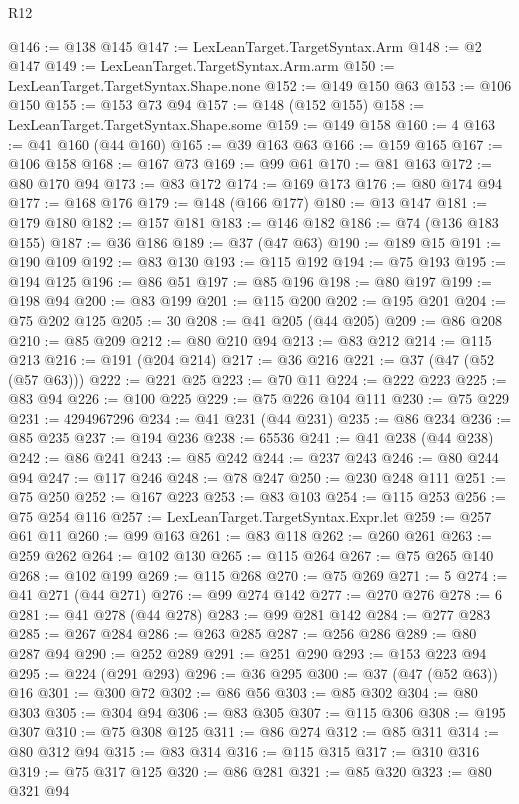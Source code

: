 \begin{lexlean}{R12}
\begin{coremodule}
@146 := @138 @145
@147 := LexLeanTarget.TargetSyntax.Arm
@148 := @2 @147
@149 := LexLeanTarget.TargetSyntax.Arm.arm
@150 := LexLeanTarget.TargetSyntax.Shape.none
@152 := @149 @150 @63
@153 := @106 @150
@155 := @153 @73 @94
@157 := @148 (@152 @155)
@158 := LexLeanTarget.TargetSyntax.Shape.some
@159 := @149 @158
@160 := 4
@163 := @41 @160 (@44 @160)
@165 := @39 @163 @63
@166 := @159 @165
@167 := @106 @158
@168 := @167 @73
@169 := @99 @61
@170 := @81 @163
@172 := @80 @170 @94
@173 := @83 @172
@174 := @169 @173
@176 := @80 @174 @94
@177 := @168 @176
@179 := @148 (@166 @177)
@180 := @13 @147
@181 := @179 @180
@182 := @157 @181
@183 := @146 @182
@186 := @74 (@136 @183 @155)
@187 := @36 @186
@189 := @37 (@47 @63)
@190 := @189 @15
@191 := @190 @109
@192 := @83 @130
@193 := @115 @192
@194 := @75 @193
@195 := @194 @125
@196 := @86 @51
@197 := @85 @196
@198 := @80 @197
@199 := @198 @94
@200 := @83 @199
@201 := @115 @200
@202 := @195 @201
@204 := @75 @202 @125
@205 := 30
@208 := @41 @205 (@44 @205)
@209 := @86 @208
@210 := @85 @209
@212 := @80 @210 @94
@213 := @83 @212
@214 := @115 @213
@216 := @191 (@204 @214)
@217 := @36 @216
@221 := @37 (@47 (@52 (@57 @63)))
@222 := @221 @25
@223 := @70 @11
@224 := @222 @223
@225 := @83 @94
@226 := @100 @225
@229 := @75 @226 @104 @111
@230 := @75 @229
@231 := 4294967296
@234 := @41 @231 (@44 @231)
@235 := @86 @234
@236 := @85 @235
@237 := @194 @236
@238 := 65536
@241 := @41 @238 (@44 @238)
@242 := @86 @241
@243 := @85 @242
@244 := @237 @243
@246 := @80 @244 @94
@247 := @117 @246
@248 := @78 @247
@250 := @230 @248 @111
@251 := @75 @250
@252 := @167 @223
@253 := @83 @103
@254 := @115 @253
@256 := @75 @254 @116
@257 := LexLeanTarget.TargetSyntax.Expr.let
@259 := @257 @61 @11
@260 := @99 @163
@261 := @83 @118
@262 := @260 @261
@263 := @259 @262
@264 := @102 @130
@265 := @115 @264
@267 := @75 @265 @140
@268 := @102 @199
@269 := @115 @268
@270 := @75 @269
@271 := 5
@274 := @41 @271 (@44 @271)
@276 := @99 @274 @142
@277 := @270 @276
@278 := 6
@281 := @41 @278 (@44 @278)
@283 := @99 @281 @142
@284 := @277 @283
@285 := @267 @284
@286 := @263 @285
@287 := @256 @286
@289 := @80 @287 @94
@290 := @252 @289
@291 := @251 @290
@293 := @153 @223 @94
@295 := @224 (@291 @293)
@296 := @36 @295
@300 := @37 (@47 (@52 @63)) @16
@301 := @300 @72
@302 := @86 @56
@303 := @85 @302
@304 := @80 @303
@305 := @304 @94
@306 := @83 @305
@307 := @115 @306
@308 := @195 @307
@310 := @75 @308 @125
@311 := @86 @274
@312 := @85 @311
@314 := @80 @312 @94
@315 := @83 @314
@316 := @115 @315
@317 := @310 @316
@319 := @75 @317 @125
@320 := @86 @281
@321 := @85 @320
@323 := @80 @321 @94

\end{coremodule}
\end{lexlean}
